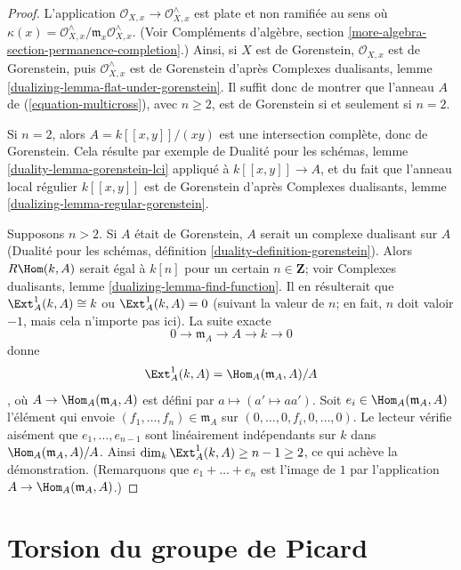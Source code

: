 \begin{proof}
L'application $\mathcal{O}_{X, x} \to \mathcal{O}_{X, x}^\wedge$ est plate et non ramifiée au sens où $\kappa(x) = \mathcal{O}_{X, x}^\wedge/\mathfrak m_x \mathcal{O}_{X, x}^\wedge$. (Voir Compléments d'algèbre, section \ref{more-algebra-section-permanence-completion}.) Ainsi, si $X$ est de Gorenstein, $\mathcal{O}_{X, x}$ est de Gorenstein, puis $\mathcal{O}_{X, x}^\wedge$ est de Gorenstein d'après Complexes dualisants, lemme \ref{dualizing-lemma-flat-under-gorenstein}. Il suffit donc de montrer que l'anneau $A$ de (\ref{equation-multicross}), avec $n \geq 2$, est de Gorenstein si et seulement si $n = 2$.

\medskip\noindent
Si $n = 2$, alors $A = k[[x, y]]/(xy)$ est une intersection complète, donc de Gorenstein. Cela résulte par exemple de Dualité pour les schémas, lemme \ref{duality-lemma-gorenstein-lci} appliqué à $k[[x, y]] \to A$, et du fait que l'anneau local régulier $k[[x, y]]$ est de Gorenstein d'après Complexes dualisants, lemme \ref{dualizing-lemma-regular-gorenstein}.

\medskip\noindent
Supposons $n > 2$. Si $A$ était de Gorenstein, $A$ serait un complexe dualisant sur $A$ (Dualité pour les schémas, définition \ref{duality-definition-gorenstein}). Alors $R\Hom(k, A)$ serait égal à $k[n]$ pour un certain $n \in \mathbf{Z}$; voir Complexes dualisants, lemme \ref{dualizing-lemma-find-function}. Il en résulterait que $\Ext^1_A(k, A) \cong k$ ou $\Ext^1_A(k, A) = 0$ (suivant la valeur de $n$; en fait, $n$ doit valoir $-1$, mais cela n'importe pas ici). La suite exacte $$
0 \to \mathfrak m_A \to A \to k \to 0
$$ donne $$
\Ext^1_A(k, A) = \Hom_A(\mathfrak m_A, A)/A
$$, où $A \to \Hom_A(\mathfrak m_A, A)$ est défini par $a \mapsto (a' \mapsto aa')$. Soit $e_i \in \Hom_A(\mathfrak m_A, A)$ l'élément qui envoie $(f_1, \ldots, f_n) \in \mathfrak m_A$ sur $(0, \ldots, 0, f_i, 0, \ldots, 0)$. Le lecteur vérifie aisément que $e_1, \ldots, e_{n - 1}$ sont linéairement indépendants sur $k$ dans $\Hom_A(\mathfrak m_A, A)/A$. Ainsi $\dim_k \Ext^1_A(k, A) \geq n - 1 \geq 2$, ce qui achève la démonstration. (Remarquons que $e_1 + \ldots + e_n$ est l'image de $1$ par l'application $A \to \Hom_A(\mathfrak m_A, A)$.)
\end{proof}




\section{Torsion du groupe de Picard}
\label{section-torsion-in-pic}

